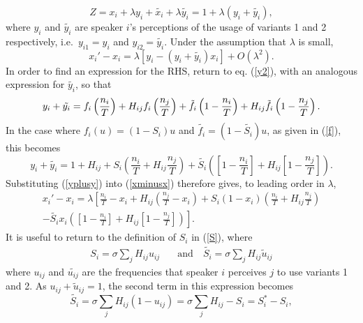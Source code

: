 \documentclass[12pt]{article}
\begin{document}
\begin{equation}
Z = x_i + \lambda y_i + \tilde{x_i} + \lambda \tilde{y_i} = 1 + \lambda \left(y_i + \tilde{y_i} \right),
\end{equation}
where $y_i$ and $\tilde{y_i}$ are speaker $i$'s perceptions of the usage of variants 1 and 2 respectively, i.e.\ $y_{i1} = y_i$ and $y_{i2} = \tilde{y_i}$.
Under the assumption that $\lambda$ is small, 
\begin{equation}\label{xminusx}
x_i' - x_i = \lambda \left[ y_i - \left( y_i + \tilde{y_i} \right) x_i \right] + O\left(\lambda ^2 \right).
\end{equation}
In order to find an expression for the RHS, return to eq. (\ref{y2}), with an analogous expression for $\tilde{y_i}$, so that
\begin{equation}
y_i + \tilde{y_i} = f_i\left( \frac{n_i}{T} \right) + H_{ij}f_i\left( \frac{n_j}{T} \right) + \tilde{f_i}\left( 1 - \frac{n_i}{T} \right) + H_{ij}\tilde{f_i}\left(1 - \frac{n_j}{T} \right). \\
\end{equation}
In the case where $f_i(u) = (1 - S_i)u$ and $\tilde{f_i} = (1 - \tilde{S_i})u$, as given in (\ref{f}), this becomes
\begin{equation}\label{yplusy}
y_i + \tilde{y_i} = 1 + H_{ij} + S_i\left( \frac{n_i}{T} + H_{ij}\frac{n_j}{T} \right) + \tilde{S_i}\left( \left[ 1 - \frac{n_i}{T} \right] + H_{ij} \left[ 1 - \frac{n_j}{T}\right]\right).
\end{equation}
Substituting (\ref{yplusy}) into (\ref{xminusx}) therefore gives, 
to leading order in $\lambda$,
\begin{multline}
x_i' - x_i = \lambda \left[ \frac{n_i}{T} - x_i + H_{ij}\left( \frac{n_j}{T} - x_i \right) \right. + S_i(1 - x_i)\left(\frac{n_i}{T} + H_{ij}\frac{n_j}{T} \right) \\ - \left.\tilde{S_i}x_i \left( \left[ 1 - \frac{n_i}{T} \right] + H_{ij} \left[ 1 - \frac{n_j}{T}\right]\right)   \right].
\end{multline}
It is useful to return to the definition of $S_i$ in (\ref{S}), where
\begin{align}
S_{i} = \sigma \sum\limits_{j} H_{ij}u_{ij} & \quad \text{and} \quad \tilde{S_{i}} = \sigma \sum\limits_{j} H_{ij}\tilde{u}_{ij} 
\end{align}
where $u_{ij}$ and $\tilde{u_{ij}}$ are the frequencies that speaker $i$ perceives $j$ to use variants 1 and 2. As $u_{ij} + \tilde{u}_{ij} = 1$, the second term in this expression becomes
\begin{equation}
\tilde{S_i} = \sigma \sum\limits_{j} H_{ij} (1 - u_{ij}) = \sigma \sum\limits_{j} H_{ij} - S_i = S_i^* - S_i,
\end{equation}
\end{document}
